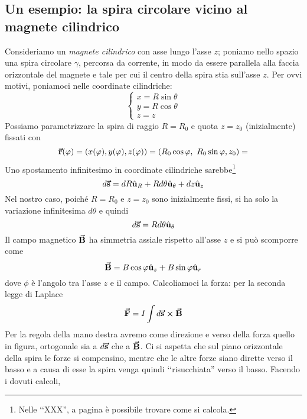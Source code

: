 \subsection{Un esempio: la spira circolare vicino al magnete cilindrico}
Consideriamo un \textit{magnete cilindrico} con asse lungo l'asse $z$; poniamo nello spazio una spira circolare $\gamma$, percorsa da corrente, in modo da essere parallela alla faccia orizzontale del magnete e tale per cui il centro della spira stia sull'asse $z$.
Per ovvi motivi, poniamoci nelle coordinate cilindriche:
\begin{equation*}
	\begin{cases}
		x=R\sin\theta\\
		y=R\cos\theta\\
		z=z
	\end{cases}
\end{equation*}
Possiamo parametrizzare la spira di raggio $R=R_0$ e quota $z=z_0$ (inizialmente) fissati con
\begin{equation*}
	\vba{r}(\phi)=\left(x(\phi),y(\phi),z(\phi)\right)=\left(R_0\cos\phi,\ R_0\sin\phi, z_0\right)=
\end{equation*}
Uno spostamento infinitesimo in coordinate cilindriche sarebbe\footnote{	Nelle ‘‘XXX'', a pagina \pageref{spinfinitesimocilindriche} è possibile trovare come si calcola.}
\begin{equation}
	d\vb*{\va{s}}=dR\hat{\mathbf{u}}_R+Rd\theta\hat{\mathbf{u}}_\theta+dz\hat{\mathbf{u}}_z
\end{equation}
Nel nostro caso, poiché $R=R_0$ e $z=z_0$ sono inizialmente fissi, si ha solo la variazione infinitesima $d\theta$ e quindi
\begin{equation}
	d\vb*{\va{s}}=Rd\theta\hat{\mathbf{u}}_\theta
\end{equation}
Il campo magnetico $\vb*{\va{B}}$ ha simmetria assiale rispetto all'asse $z$ e si può scomporre come
\begin{equation}
	\vb*{\va{B}}=B\cos\varphi\hat{\mathbf{u}}_z+B\sin\varphi\hat{\mathbf{u}}_r
\end{equation}
dove $\phi$ è l'angolo tra l'asse $z$ e il campo. Calcoliamoci la forza: per la seconda legge di Laplace
\begin{equation*}
	\vb*{\va{F}}=I\int d\vb*{\va{s}}\cross\vb*{\va{B}}
\end{equation*}
Per la regola della mano destra avremo come direzione e verso della forza quello in figura, ortogonale sia a $d\vb*{\va{s}}$ che a $\vb*{\va{B}}$.
Ci si aspetta che sul piano orizzontale della spira le forze si compensino, mentre che le altre forze siano dirette verso il basso e a causa di esse la spira venga quindi ‘‘risucchiata'' verso il basso. Facendo i dovuti calcoli,
